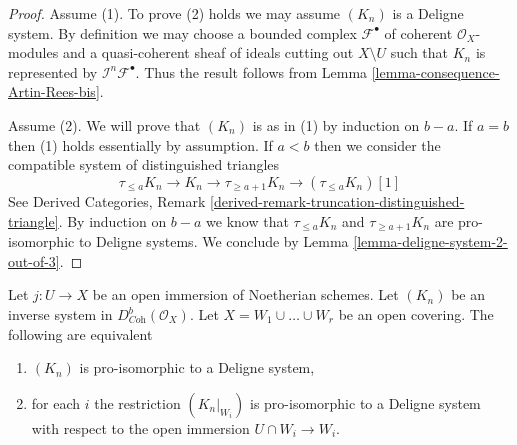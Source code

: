 \begin{proof}
Assume (1). To prove (2) holds we may assume $(K_n)$ is a Deligne system.
By definition we may choose a bounded complex $\mathcal{F}^\bullet$
of coherent $\mathcal{O}_X$-modules and a quasi-coherent
sheaf of ideals cutting out $X \setminus U$ such that
$K_n$ is represented by $\mathcal{I}^n\mathcal{F}^\bullet$.
Thus the result follows from Lemma \ref{lemma-consequence-Artin-Rees-bis}.

\medskip\noindent
Assume (2). We will prove that $(K_n)$ is as in (1) by induction on
$b - a$. If $a = b$ then (1) holds essentially by assumption.
If $a < b$ then we consider the compatible system of
distinguished triangles
$$
\tau_{\leq a}K_n \to K_n \to \tau_{\geq a + 1}K_n \to (\tau_{\leq a}K_n)[1]
$$
See Derived Categories, Remark
\ref{derived-remark-truncation-distinguished-triangle}.
By induction on $b - a$ we know that $\tau_{\leq a}K_n$ and
$\tau_{\geq a + 1}K_n$ are pro-isomorphic to Deligne systems.
We conclude by Lemma \ref{lemma-deligne-system-2-out-of-3}.
\end{proof}

\begin{lemma}
\label{lemma-characterize-extension-by-zero}
Let $j : U \to X$ be an open immersion of Noetherian schemes. Let
$(K_n)$ be an inverse system in $D^b_{\textit{Coh}}(\mathcal{O}_X)$.
Let $X = W_1 \cup \ldots \cup W_r$ be an open covering.
The following are equivalent
\begin{enumerate}
\item $(K_n)$ is pro-isomorphic to a Deligne system,
\item for each $i$ the restriction $(K_n|_{W_i})$
is pro-isomorphic to a Deligne system with respect to
the open immersion $U \cap W_i \to W_i$.
\end{enumerate}
\end{lemma}

